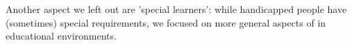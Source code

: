 Another aspect we left out are 'special learners': while handicapped people have (sometimes) special requirements, we focused on more general aspects of \AR in educational environments. \\
% 
% 

